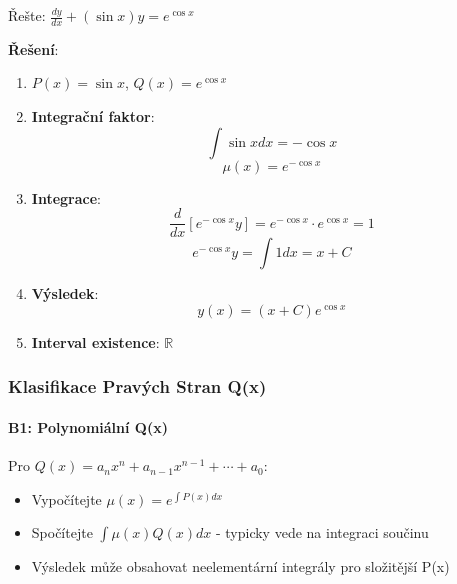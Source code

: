 \vspace{0.6\baselineskip}

\begin{example}
Řešte: $\frac{dy}{dx} + (\sin x)y = e^{\cos x}$
\vspace{0.3\baselineskip}

\textbf{Řešení}: 
\begin{enumerate}
\item $P(x) = \sin x$, $Q(x) = e^{\cos x}$

\item \textbf{Integrační faktor}:
\[
\int \sin x  dx = -\cos x
\]
\[
\mu(x) = e^{-\cos x}
\]

\item \textbf{Integrace}:
\[
\frac{d}{dx}[e^{-\cos x}y] = e^{-\cos x} \cdot e^{\cos x} = 1
\]
\[
e^{-\cos x}y = \int 1  dx = x + C
\]

\item \textbf{Výsledek}:
\[
y(x) = (x + C)e^{\cos x}
\]

\item \textbf{Interval existence}: $\mathbb{R}$
\end{enumerate}
\end{example}

\vspace{0.8\baselineskip}

\subsubsection{Klasifikace Pravých Stran Q(x)}
\label{subsubsec:klasifikace-qx}

\paragraph*{B1: Polynomiální Q(x)}

\begin{remark}
Pro $Q(x) = a_nx^n + a_{n-1}x^{n-1} + \cdots + a_0$:
\begin{itemize}
\item Vypočítejte $\mu(x) = e^{\int P(x)dx}$
\item Spočítejte $\int \mu(x)Q(x)dx$ - typicky vede na integraci součinu
\item Výsledek může obsahovat neelementární integrály pro složitější P(x)
\end{itemize}
\end{remark}

